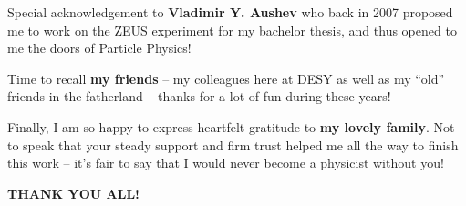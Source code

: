 Special acknowledgement to {\bf Vladimir Y. Aushev} who back in 2007 proposed me to work on the ZEUS experiment for my bachelor thesis, and thus opened to me the doors of Particle Physics!
\smallskip

Time to recall {\bf my friends} -- my colleagues here at DESY as well as my ``old'' friends in the fatherland -- thanks for a lot of fun during these years!
\smallskip

Finally, I am so happy to express heartfelt gratitude to {\bf my lovely family}.
Not to speak that your steady support and firm trust helped me all the way to finish this work -- it's fair to say that I would never become a physicist without you!
\vspace{\baselineskip}

{\bf THANK YOU ALL! }